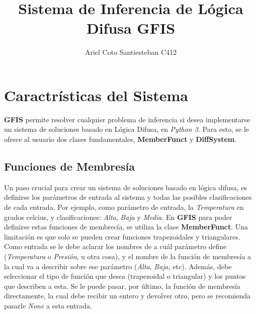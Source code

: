 \documentclass[11pt]{article}
\title{Sistema de Inferencia de L\'ogica Difusa GFIS}
\author{Ariel Coto Santiesteban C412}
\begin{document}
\maketitle
\section{Caractr\'isticas del Sistema}
\textbf{GFIS} permite resolver cualquier problema de inferencia si desea implementarse un sistema de soluciones basado en L\'ogica Difusa, en \emph{Python 3}. Para esto, se le ofrece al usuario dos clases fundamentales, \textbf{MemberFunct} y \textbf{DiffSystem}.
\subsection{Funciones de Membres\'ia}
Un paso crucial para crear un sistema de soluciones basado en l\'ogica difusa, es definirse los par\'ametros de entrada al sistema y todas las posibles clasificaciones de cada entrada. Por ejemplo, como par\'ametro de entrada, la \emph{Temperatura} en grados celcius, y clasificaciones: \emph{Alta}, \emph{Baja} y \emph{Media}. En \textbf{GFIS} para poder definirse estas funciones de membrec\'ia, se utiliza la clase \textbf{MemberFunct}. Una limitaci\'on es que solo se pueden crear funciones trapezoidales y triangulares. Como entrada se le debe aclarar los nombres de a cu\'al par\'ametro define (\emph{Temperatura} o \emph{Presi\'on}, u otra cosa), y el nombre de la funci\'on de membres\'ia a la cual va a describir sobre ese par\'ametro (\emph{Alta}, \emph{Baja}, etc). Adem\'as, debe seleccionar el tipo de funci\'on que desea (trapezoidal o triangular) y los puntos que describen a esta. Se le puede pasar, por \'ultimo, la funci\'on de membres\'ia directamente, la cual debe recibir un entero y devolver otro, pero se recomienda pasarle \textit{None} a esta entrada. \\
\end{document}
